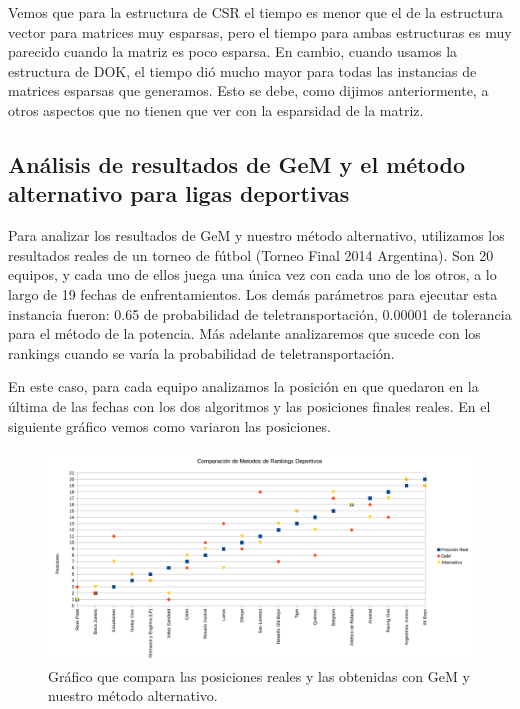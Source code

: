 Vemos que para la estructura de CSR el tiempo es menor que el de la estructura vector para matrices muy esparsas, pero el tiempo para ambas estructuras es muy parecido cuando la matriz es poco esparsa. En cambio, cuando usamos la estructura de DOK, el tiempo dió mucho mayor para todas las instancias de matrices esparsas que generamos. Esto se debe, como dijimos anteriormente, a otros aspectos que no tienen que ver con la esparsidad de la matriz.\\

\newpage

\subsection{Análisis de resultados de GeM y el método alternativo para ligas deportivas}

Para analizar los resultados de GeM y nuestro método alternativo, utilizamos los resultados reales de un torneo de fútbol (Torneo Final 2014 Argentina). Son 20 equipos, y cada uno de ellos juega una única vez con cada uno de los otros, a lo largo de 19 fechas de enfrentamientos. Los demás parámetros para ejecutar esta instancia fueron: 0.65 de probabilidad de teletransportación, 0.00001 de tolerancia para el método de la potencia. Más adelante analizaremos que sucede con los rankings cuando se varía la probabilidad de teletransportación.

En este caso, para cada equipo analizamos la posición en que quedaron en la última de las fechas con los dos algoritmos y las posiciones finales reales. En el siguiente gráfico vemos como variaron las posiciones. 


\begin{figure}[H]
  \includegraphics[scale=0.5]{imagenes/posicionesgem.png}
   \caption{Gráfico que compara las posiciones reales y las obtenidas con GeM y nuestro método alternativo.}
  \label{fig:img1}
\end{figure}

